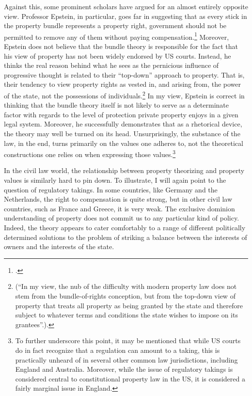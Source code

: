 Against this, some prominent scholars have argued for an almost entirely opposite view. Professor Epstein, in particular, goes far in suggesting that as every stick in the property bundle represents a property right, government should not be permitted to remove any of them without paying compensation.\footcite[232-233]{epstein11} Moreover, Epstein does not believe that the bundle theory is responsible for the fact that his view of property has not been widely endorsed by US courts. Instead, he thinks the real reason behind what he sees as the pernicious influence of progressive thought is related to their ``top-down'' approach to property. That is, their tendency to view property rights as vested in, and arising from, the power of the state, not the possessions of individuals.\footnote{\cite[227-228]{epstein11} (``In my view, the nub of the difficulty with modern property law does not stem from the bundle-of-rights conception, but from the top-down view of property that treats all property as being granted by the state and therefore subject to whatever terms and conditions the state wishes to impose on its grantees''.).} In my view, Epstein is correct in thinking that the bundle theory itself is not likely to serve as a determinate factor with regards to the level of protection private property enjoys in a given legal system. Moreover, he successfully demonstrates that as a rhetorical device, the theory may well be turned on its head. Unsurprisingly, the substance of the law, in the end, turns primarily on the values one adheres to, not the theoretical constructions one relies on when expressing those values.\footnote{To further underscore this point, it may be mentioned that while US courts do in fact recognize that a regulation can amount to a taking, this is practically unheard of in several other common law jurisdictions, including England and Australia. Moreover, while the issue of regulatory takings is considered central to constitutional property law in the US, it is considered a fairly marginal issue in England.\cite{altermann12}}

In the civil law world, the relationship between property theorizing and property values is similarly hard to pin down. To illustrate, I will again point to the question of regulatory takings. In some countries, like Germany and the Netherlands, the right to compensation is quite strong, but in other civil law countries, such as France and Greece, it is very weak. The exclusive dominion understanding of property does not commit us to any particular kind of policy. Indeed, the theory appears to cater comfortably to a range of different politically determined solutions to the problem of striking a balance between the interests of owners and the interests of the state. 

